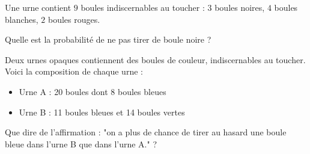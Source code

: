 \begin{pageParcoursd}
 

Une urne contient $9$ boules indiscernables au toucher : $3$ boules noires, $4$ boules blanches, $2$ boules rouges.

Quelle est la probabilité de ne pas tirer de boule noire ? 


Deux urnes opaques contiennent des boules de couleur, indiscernables au toucher.
Voici la composition de chaque urne :
\begin{itemize}
\item Urne A : 20 boules dont 8 boules bleues
\item Urne B : 11 boules bleues et 14 boules vertes
\end{itemize}
Que dire de l'affirmation : "on a plus de chance de tirer au hasard une boule bleue dans l'urne B que dans l'urne A." ? 







\end{pageParcoursd}

